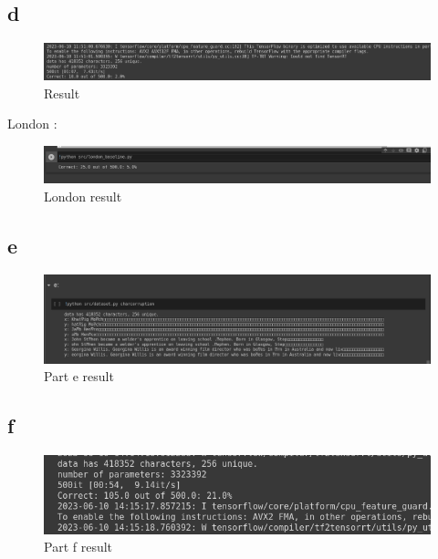 \documentclass[a4paper]{article}
\begin{document}
\subsection*{d}

\begin{figure}[ht]
    \centering
    \includegraphics[width=1\textwidth]{./image/2.d.png}
    \caption{Result}
\end{figure}

London : 

\begin{figure}[ht]
    \centering
    \includegraphics[width=1\textwidth]{./image/2.d.london.png}
    \caption{London result}
\end{figure}

\subsection*{e}

\begin{figure}[ht]
    \centering
    \includegraphics[width=1\textwidth]{./image/2.e.png}
    \caption{Part e result}
\end{figure}

\newpage

\subsection*{f}

\begin{figure}[ht]
    \centering
    \includegraphics[width=1\textwidth]{./image/2.f.png}
    \caption{Part f result}
\end{figure}
\end{document}
